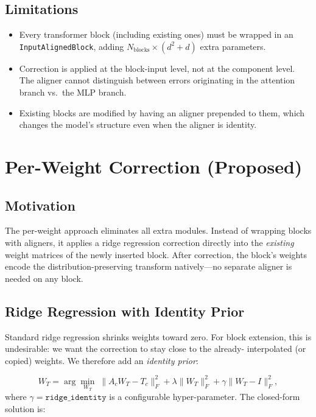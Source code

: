 \documentclass[11pt,a4paper]{article}
\begin{document}
\subsection{Limitations}
\label{subsec:aligner_limits}

\begin{itemize}
    \item Every transformer block (including existing ones) must be wrapped in
          an \texttt{InputAlignedBlock}, adding $N_{\text{blocks}} \times
          (d^2 + d)$ extra parameters.
    \item Correction is applied at the block-input level, not at the component
          level. The aligner cannot distinguish between errors originating
          in the attention branch vs.\ the MLP branch.
    \item Existing blocks are modified by having an aligner prepended to them,
          which changes the model's structure even when the aligner is identity.
\end{itemize}

\section{Per-Weight Correction (Proposed)}
\label{sec:per_weight}

\subsection{Motivation}
\label{subsec:pw_motivation}

The per-weight approach eliminates all extra modules. Instead of wrapping
blocks with aligners, it applies a ridge regression correction directly into
the \emph{existing} weight matrices of the newly inserted block. After
correction, the block's weights encode the distribution-preserving transform
natively---no separate aligner is needed on any block.

\subsection{Ridge Regression with Identity Prior}
\label{subsec:ridge_id}

Standard ridge regression shrinks weights toward zero. For block extension,
this is undesirable: we want the correction to stay close to the already-
interpolated (or copied) weights. We therefore add an \emph{identity prior}:

\begin{equation}
    W_T = \arg\min_{W_T} \;
    \|A_c W_T - T_c\|_F^2
    + \lambda \|W_T\|_F^2
    + \gamma \|W_T - I\|_F^2,
\end{equation}
where $\gamma = \texttt{ridge\_identity}$ is a configurable hyper-parameter.
The closed-form solution is:
\end{document}
